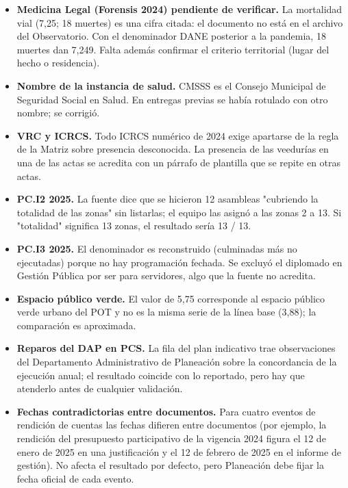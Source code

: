 \documentclass[11pt,letterpaper]{article}
\begin{document}
\begin{itemize}

\item \textbf{Medicina Legal (Forensis 2024) pendiente de verificar.} La mortalidad vial (7,25; 18 muertes) es una cifra citada: el documento no está en el archivo del Observatorio. Con el denominador DANE posterior a la pandemia, 18 muertes dan 7,249. Falta además confirmar el criterio territorial (lugar del hecho o residencia).

\item \textbf{Nombre de la instancia de salud.} CMSSS es el Consejo Municipal de Seguridad Social en Salud. En entregas previas se había rotulado con otro nombre; se corrigió.

\item \textbf{VRC y ICRCS.} Todo ICRCS numérico de 2024 exige apartarse de la regla de la Matriz sobre presencia desconocida. La presencia de las veedurías en una de las actas se acredita con un párrafo de plantilla que se repite en otras actas.

\item \textbf{PC.I2 2025.} La fuente dice que se hicieron 12 asambleas "cubriendo la totalidad de las zonas" sin listarlas; el equipo las asignó a las zonas 2 a 13. Si "totalidad" significa 13 zonas, el resultado sería 13 / 13.

\item \textbf{PC.I3 2025.} El denominador es reconstruido (culminadas más no ejecutadas) porque no hay programación fechada. Se excluyó el diplomado en Gestión Pública por ser para servidores, algo que la fuente no acredita.

\item \textbf{Espacio público verde.} El valor de 5,75 corresponde al espacio público verde urbano del POT y no es la misma serie de la línea base (3,88); la comparación es aproximada.

\item \textbf{Reparos del DAP en PCS.} La fila del plan indicativo trae observaciones del Departamento Administrativo de Planeación sobre la concordancia de la ejecución anual; el resultado coincide con lo reportado, pero hay que atenderlo antes de cualquier validación.

\item \textbf{Fechas contradictorias entre documentos.} Para cuatro eventos de rendición de cuentas las fechas difieren entre documentos (por ejemplo, la rendición del presupuesto participativo de la vigencia 2024 figura el 12 de enero de 2025 en una justificación y el 12 de febrero de 2025 en el informe de gestión). No afecta el resultado por defecto, pero Planeación debe fijar la fecha oficial de cada evento.


\end{itemize}
\end{document}
